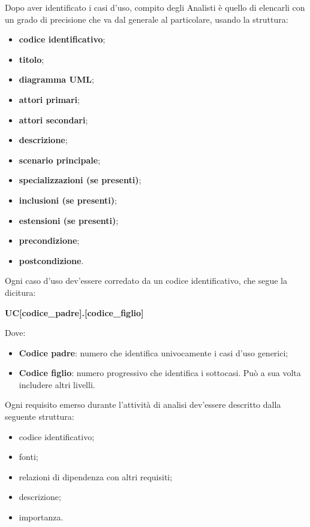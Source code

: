 		Dopo aver identificato i casi d'uso, compito degli Analisti è quello di elencarli con un grado di precisione che va dal generale al particolare, usando la struttura:
		\begin{itemize}
	    	\item{\textbf{codice identificativo}}; 
	    	\item{\textbf{titolo}}; 
	    	\item{\textbf{diagramma UML}}; 
	    	\item{\textbf{attori primari}}; 
	    	\item{\textbf{attori secondari}}; 
	    	\item{\textbf{descrizione}}; 
	    	\item{\textbf{scenario principale}}; 
    		\item{\textbf{specializzazioni (se presenti)}}; 
	    	\item{\textbf{inclusioni (se presenti)}}; 
	    	\item{\textbf{estensioni (se presenti)}}; 
	    	\item{\textbf{precondizione}};
	    	\item{\textbf{postcondizione}}. 
		\end{itemize}
		
		\noindent Ogni caso d'uso dev'essere corredato da un codice identificativo, che segue la dicitura: 
		\begin{center}
			\textbf{UC[codice\_padre].[codice\_figlio]}
		\end{center}
		
		\noindent Dove:
		\begin{itemize}
         	\item{\textbf{Codice padre}: numero che identifica univocamente i casi d'uso generici;}
         	\item{\textbf{Codice figlio}: numero progressivo che identifica i sottocasi. Può a sua volta includere altri livelli.}
		\end{itemize}
         
		Ogni requisito emerso durante l'attività di analisi dev'essere descritto dalla seguente struttura:
           	\begin{itemize}
                  	\item{codice identificativo;}
                  	\item{fonti;} 
                  	\item{relazioni di dipendenza con altri requisiti;}
                  	\item{descrizione;}
                  	\item{importanza.}
    			\end{itemize}
               
